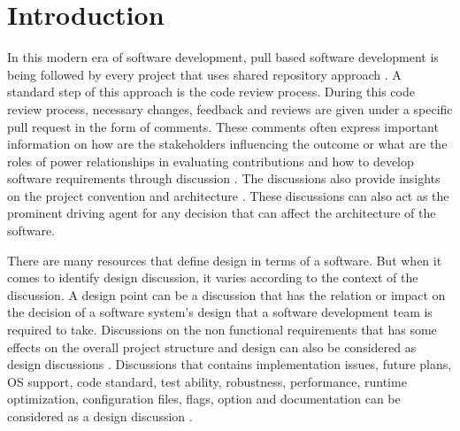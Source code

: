 \section{Introduction}
\label{sect:introduction}
In this modern era of software development, pull based software development is being followed by every project that uses shared repository approach \cite{Gousios2014}. A standard step of this approach is the code review process. During this code review process, necessary changes, feedback and reviews are given under a specific pull request in the form of comments. These comments often express important information on how are the stakeholders influencing the outcome or what are the roles of power relationships in evaluating contributions and how to develop software requirements through discussion \cite{Tsay2014}. The discussions also provide insights on the project convention and architecture \cite{Motta2018}. These discussions can also act as the prominent driving agent for any decision that can affect the architecture of the software.

There are many resources that define design in terms of a software. But when it comes to identify design discussion, it varies according to the context of the discussion. A design point \cite{Viviani2018} can be a discussion that has the relation or impact on the decision of a software system's design that a software development team is required to take. Discussions on the non functional requirements that has some effects on the overall project structure and design can also be considered as design discussions \cite{Sousa2018}. Discussions that contains implementation issues, future plans, OS support, code standard, test ability, robustness, performance, runtime optimization, configuration files, flags, option and documentation can be considered as a design discussion \cite{Viviani2018}.

